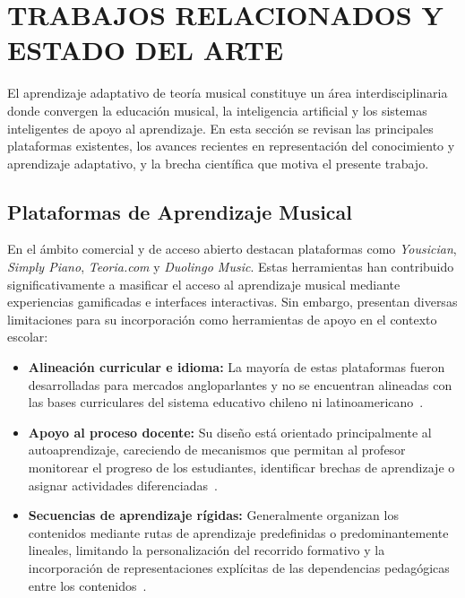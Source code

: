 \section{TRABAJOS RELACIONADOS Y ESTADO DEL ARTE}

El aprendizaje adaptativo de teoría musical constituye un área interdisciplinaria donde convergen la educación musical, la inteligencia artificial y los sistemas inteligentes de apoyo al aprendizaje. En esta sección se revisan las principales plataformas existentes, los avances recientes en representación del conocimiento y aprendizaje adaptativo, y la brecha científica que motiva el presente trabajo.

\subsection{Plataformas de Aprendizaje Musical}

En el ámbito comercial y de acceso abierto destacan plataformas como \textit{Yousician}, \textit{Simply Piano}, \textit{Teoria.com} y \textit{Duolingo Music}. Estas herramientas han contribuido significativamente a masificar el acceso al aprendizaje musical mediante experiencias gamificadas e interfaces interactivas. Sin embargo, presentan diversas limitaciones para su incorporación como herramientas de apoyo en el contexto escolar:

\begin{itemize}

\item \textbf{Alineación curricular e idioma:} La mayoría de estas plataformas fueron desarrolladas para mercados angloparlantes y no se encuentran alineadas con las bases curriculares del sistema educativo chileno ni latinoamericano~\cite{garcia2025,alrowais2025}.

\item \textbf{Apoyo al proceso docente:} Su diseño está orientado principalmente al autoaprendizaje, careciendo de mecanismos que permitan al profesor monitorear el progreso de los estudiantes, identificar brechas de aprendizaje o asignar actividades diferenciadas~\cite{garcia2025,alrowais2025,li2025}.

\item \textbf{Secuencias de aprendizaje rígidas:} Generalmente organizan los contenidos mediante rutas de aprendizaje predefinidas o predominantemente lineales, limitando la personalización del recorrido formativo y la incorporación de representaciones explícitas de las dependencias pedagógicas entre los contenidos~\cite{alrowais2025,li2025}.

\end{itemize}

